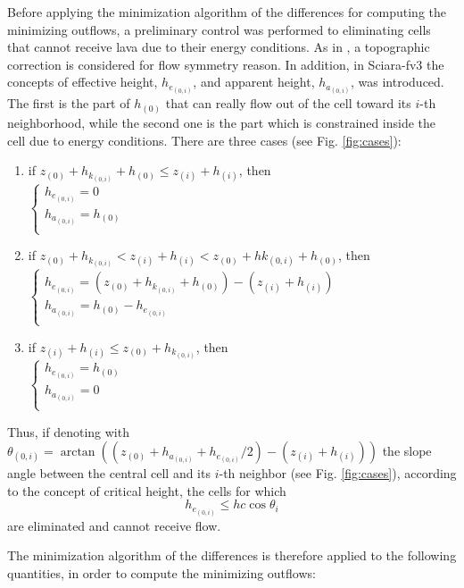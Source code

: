 Before applying the minimization algorithm of the differences for computing the
minimizing outflows, a preliminary control was performed to eliminating cells
that cannot receive lava due to their energy conditions. As in
\cite{Spataro2010}, a topographic correction is considered for flow symmetry
reason. In addition, in Sciara-fv3 the concepts of effective height,
$h_{e_{(0,i)}}$, and apparent height, $h_{a_{(0,i)}}$, was introduced. The first
is the part of $h_{(0)}$ that can really flow out of the cell toward its $i$-th
neighborhood, while the second one is the part which is constrained inside the
cell due to energy conditions. There are three cases (see Fig. \ref{fig:cases}):
\begin{enumerate}
\item if $z_{(0)} + h_{k_{(0,i)}} + h_{(0)} \leq z_{(i)} + h_{(i)}$, then \\
$\begin{cases}
	h_{e_{(0,i)}} = 0\\
	h_{a_{(0,i)}} = h_{(0)}\\
\end{cases}$
\item if $z_{(0)} + h_{k_{(0,i)}} < z_{(i)} + h_{(i)} < z_{(0)} + hk_{(0,i)} + h_{(0)}$, then \\
$\begin{cases}
	h_{e_{(0,i)}} = (z_{(0)} + h_{k_{(0,i)}} + h_{(0)}) - (z_{(i)} + h_{(i)})\\
	h_{a_{(0,i)}} = h_{(0)} - h_{e_{(0,i)}}\\
\end{cases}$
\item if $z_{(i)} + h_{(i)} \leq z_{(0)} + h_{k_{(0,i)}}$, then \\
$\begin{cases}
	h_{e_{(0,i)}} = h_{(0)}\\
	h_{a_{(0,i)}} = 0\\
\end{cases}$
\end{enumerate}
Thus, if denoting with $\theta_{(0,i)} = \arctan ((z_{(0)} + h_{a_{(0,i)}} + h_{e_{(0,i)}}/2) - (z_{(i)} + h_{(i)}))$ the slope angle between the central cell and its $i$-th neighbor (see Fig. \ref{fig:cases}), according to the concept of critical height, the cells for which
$$
h_{e_{(0,i)}} \leq hc \cos \theta_i
$$
are eliminated and cannot receive flow.

The minimization algorithm of the differences is therefore applied to the following quantities, in order to compute the minimizing outflows:

